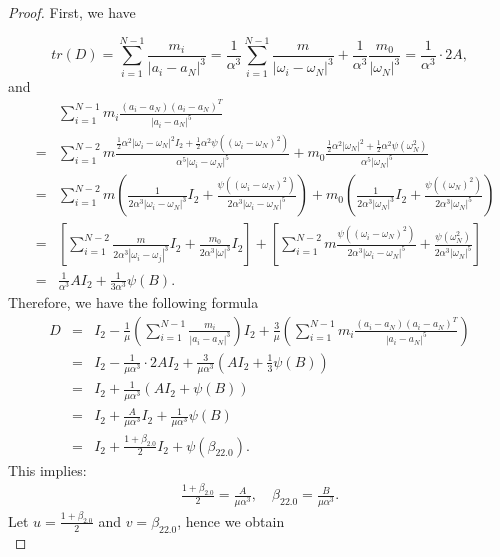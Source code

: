 \documentclass[11pt]{article}
\begin{document}
 \begin{proof}
First, we have
 
 \begin{displaymath}
 tr(D)=\sum_{i=1}^{N-1}\frac{m_i}{|a_i-a_N|^3}  
 =\frac{1}{\alpha^3}\sum_{i=1}^{N-1}\frac{m}{|\omega_i-\omega_N|^3}+\frac{1}{\alpha^3}\frac{m_0}{|\omega_N|^3}
 =\frac{1}{\alpha^3}\cdot 2A,
 \end{displaymath}
 and
 \begin{eqnarray*}
 	&&
 	\sum_{i=1}^{N-1}m_i\frac{(a_i-a_N)(a_i-a_N)^T}{|a_i-a_N|^5}
 	\\
 	&=&
 	\sum_{i=1}^{N-2}m\frac{\frac{1}{2}\alpha^2|\omega_i-\omega_N|^2I_2+\frac{1}{2}\alpha^2\psi((\omega_i-\omega_N)^2)}
 	{\alpha^5|\omega_i-\omega_ N|^5}+
 	m_0\frac{\frac{1}{2}\alpha^2|\omega_N|^2+\frac{1}{2}\alpha^2\psi(\omega_N^2)}{\alpha^5|\omega_N|^5}
 	\\
 	&=&
 	\sum_{i=1}^{N-2}m(\frac{1}{2\alpha^3|\omega_i-\omega_N|^3}I_2+\frac{\psi((\omega_i-\omega_N)^2)}{2\alpha^3|\omega_i-\omega_N|^5})+
 	m_0(\frac{1}{2\alpha^3|\omega_N|^3}I_2+\frac{\psi((\omega_N)^2)}{2\alpha^3|\omega_N|^5})\\
 	&=&
 	[\sum_{i=1}^{N-2}\frac{m}{2\alpha^3|\omega_i-\omega_j|^3}I_2+\frac{m_0}{2\alpha^3|\omega|^3}I_2]+
 	[\sum_{i=1}^{N-2}m\frac{\psi((\omega_i-\omega_N)^2)}{2\alpha^3|\omega_i-\omega_N|^5}+\frac{\psi(\omega_N^2)}{2\alpha^3|\omega_N|^5}]\\
 	&=&
 	\frac{1}{\alpha^3}AI_2+\frac{1}{3\alpha^3}\psi(B).
 \end{eqnarray*}
 Therefore, we have the following formula
 \begin{eqnarray*}
 	D&=&I_2-\frac{1}{\mu}(\sum_{i=1}^{N-1}\frac{m_i}{|a_i-a_N|^3})I_2+\frac{3}{\mu}(\sum_{i=1}^{N-1}m_i\frac{(a_i-a_N)(a_i-a_N)^T}{|a_i-a_N|^5})\\
 	&=&I_2-\frac{1}{\mu\alpha^3}\cdot 2AI_2+\frac{3}{\mu\alpha^3}(AI_2+\frac{1}{3}\psi(B))\\
 	&=&I_2+\frac{1}{\mu\alpha^3}(AI_2+\psi(B))\\
 	&=&I_2+\frac{A}{\mu\alpha^3}I_2+\frac{1}{\mu\alpha^3}\psi(B)\\
 	&=&I_2+\frac{1+\beta_{2.0}}{2}I_2+\psi(\beta_{22.0}).
 \end{eqnarray*}
 This implies:
 \begin{eqnarray*}
 	\frac{1+\beta_{2.0}}{2}=\frac{A}{\mu\alpha^3},\quad 
 	\beta_{22.0}=\frac{B}{\mu\alpha^3}.
 \end{eqnarray*}
 Let $u=\frac{1+\beta_{2.0}}{2}$ and $ v=\beta_{22.0}$, hence we obtain
 \begin{displaymath}

\end{displaymath}
\end{proof}
\end{document}
